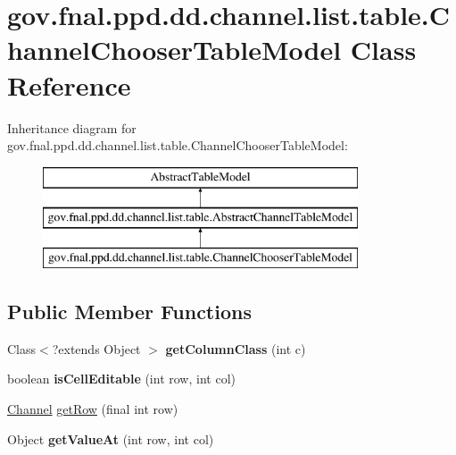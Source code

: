 \hypertarget{classgov_1_1fnal_1_1ppd_1_1dd_1_1channel_1_1list_1_1table_1_1ChannelChooserTableModel}{\section{gov.\-fnal.\-ppd.\-dd.\-channel.\-list.\-table.\-Channel\-Chooser\-Table\-Model Class Reference}
\label{classgov_1_1fnal_1_1ppd_1_1dd_1_1channel_1_1list_1_1table_1_1ChannelChooserTableModel}
}
Inheritance diagram for gov.\-fnal.\-ppd.\-dd.\-channel.\-list.\-table.\-Channel\-Chooser\-Table\-Model\-:\begin{figure}[H]
\begin{center}
\leavevmode
\includegraphics[height=3.000000cm]{classgov_1_1fnal_1_1ppd_1_1dd_1_1channel_1_1list_1_1table_1_1ChannelChooserTableModel}
\end{center}
\end{figure}
\subsection*{Public Member Functions}
\begin{DoxyCompactItemize}
\item 
\hypertarget{classgov_1_1fnal_1_1ppd_1_1dd_1_1channel_1_1list_1_1table_1_1ChannelChooserTableModel_aee82669d923468d8771f356e6c79be92}{Class$<$?extends Object $>$ {\bfseries get\-Column\-Class} (int c)}\label{classgov_1_1fnal_1_1ppd_1_1dd_1_1channel_1_1list_1_1table_1_1ChannelChooserTableModel_aee82669d923468d8771f356e6c79be92}

\item 
\hypertarget{classgov_1_1fnal_1_1ppd_1_1dd_1_1channel_1_1list_1_1table_1_1ChannelChooserTableModel_ab91b1da702ee05933622a6aad3439424}{boolean {\bfseries is\-Cell\-Editable} (int row, int col)}\label{classgov_1_1fnal_1_1ppd_1_1dd_1_1channel_1_1list_1_1table_1_1ChannelChooserTableModel_ab91b1da702ee05933622a6aad3439424}

\item 
\hyperlink{interfacegov_1_1fnal_1_1ppd_1_1dd_1_1signage_1_1Channel}{Channel} \hyperlink{classgov_1_1fnal_1_1ppd_1_1dd_1_1channel_1_1list_1_1table_1_1ChannelChooserTableModel_a60f6f27e6f106dcbbdc21bece4b2f6bf}{get\-Row} (final int row)
\item 
\hypertarget{classgov_1_1fnal_1_1ppd_1_1dd_1_1channel_1_1list_1_1table_1_1ChannelChooserTableModel_adcb62fe264622dd9718a3587622a064f}{Object {\bfseries get\-Value\-At} (int row, int col)}\label{classgov_1_1fnal_1_1ppd_1_1dd_1_1channel_1_1list_1_1table_1_1ChannelChooserTableModel_adcb62fe264622dd9718a3587622a064f}

\end{DoxyCompactItemize}

